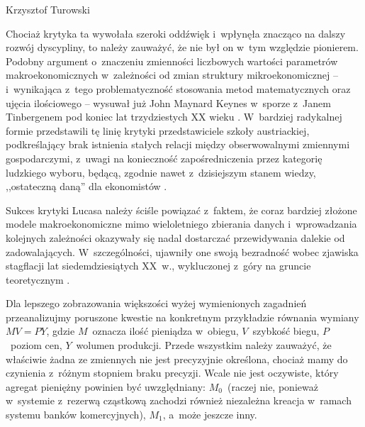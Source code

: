 \begin{artplenv}{Krzysztof Turowski}

Chociaż krytyka ta wywołała szeroki oddźwięk i~wpłynęła znacząco na dalszy rozwój dyscypliny, to należy zauważyć, że nie
był on w~tym względzie pionierem. Podobny argument o~znaczeniu zmienności liczbowych wartości parametrów
makroekonomicznych w~zależności od zmian struktury mikroekonomicznej  --  i~wynikająca z~tego problematyczność
stosowania metod matematycznych oraz ujęcia ilościowego  --  wysuwał już John Maynard Keynes w~sporze z~Janem
Tinbergenem pod koniec lat trzydziestych XX wieku
\parencite{keynes_professor_1939}.
W~bardziej radykalnej formie
przedstawili tę linię krytyki przedstawiciele szkoły austriackiej, podkreślający brak istnienia stałych relacji między
obserwowalnymi zmiennymi gospodarczymi, z~uwagi na konieczność zapośredniczenia przez kategorię ludzkiego wyboru,
będącą, zgodnie nawet z~dzisiejszym stanem wiedzy, ,,ostateczną daną'' dla ekonomistów
\parencite{mises_ludzkie_2007,rothbard_praxeology:_1976}.

Sukces krytyki Lucasa należy ściśle powiązać z~faktem, że coraz bardziej złożone modele makroekonomiczne mimo
wieloletniego zbierania danych i~wprowadzania kolejnych zależności okazywały się nadal dostarczać przewidywania dalekie
od zadowalających. W~szczególności, ujawniły one swoją bezradność wobec zjawiska stagflacji lat siedemdziesiątych
XX~w., wykluczonej z~góry na gruncie teoretycznym
\parencite{kydland_econometrics_1991}.

Dla lepszego zobrazowania większości wyżej wymienionych zagadnień przeanalizujmy poruszone kwestie na konkretnym
przykładzie równania wymiany $MV = PY$, gdzie $M$~oznacza ilość pieniądza w~obiegu, $V$~szybkość biegu, $P$~poziom cen,
$Y$~wolumen produkcji. Przede wszystkim należy zauważyć, że właściwie żadna ze zmiennych nie
jest precyzyjnie określona, chociaż mamy do czynienia z~różnym stopniem braku precyzji.
Wcale nie jest oczywiste, który agregat pieniężny powinien być
uwzględniany: $M_0$~(raczej nie, ponieważ w~systemie z~rezerwą cząstkową zachodzi
również niezależna kreacja w~ramach systemu banków komercyjnych), $M_1$, a~może jeszcze
inny.


\end{artplenv}
